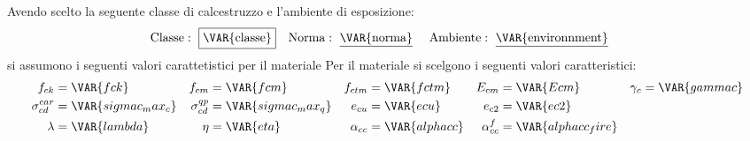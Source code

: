     
   
   
Avendo scelto la seguente classe di calcestruzzo e l'ambiente di esposizione:
\begin{align*}
\text{Classe} &: \text{ \fbox{\VAR{classe}}} & \text{Norma} &: \text{ \underline{\VAR{norma}} } & \text{Ambiente} &: \text{ \underline{\VAR{environnment}} }
\end{align*}
si assumono i seguenti valori carattetistici per il materiale
Per il materiale si scelgono i seguenti valori caratteristici:
\begin{align*}
           f_{ck} &= \VAR{fck}          &           f_{cm} &= \VAR{fcm}          &     f_{ctm} &= \VAR{fctm}    &        E_{cm} &= \VAR{Ecm} & \gamma_c &= \VAR{gammac} \\
\sigma^{car}_{cd} &= \VAR{sigmac_max_c} & \sigma^{qp}_{cd} &= \VAR{sigmac_max_q} &      e_{cu} &= \VAR{ecu}     &        e_{c2} &= \VAR{ec2} \\
          \lambda &= \VAR{lambda}       &             \eta &= \VAR{eta}          & \alpha_{cc} &= \VAR{alphacc} & \alpha^f_{cc} &= \VAR{alphacc_fire} &
\end{align*}
